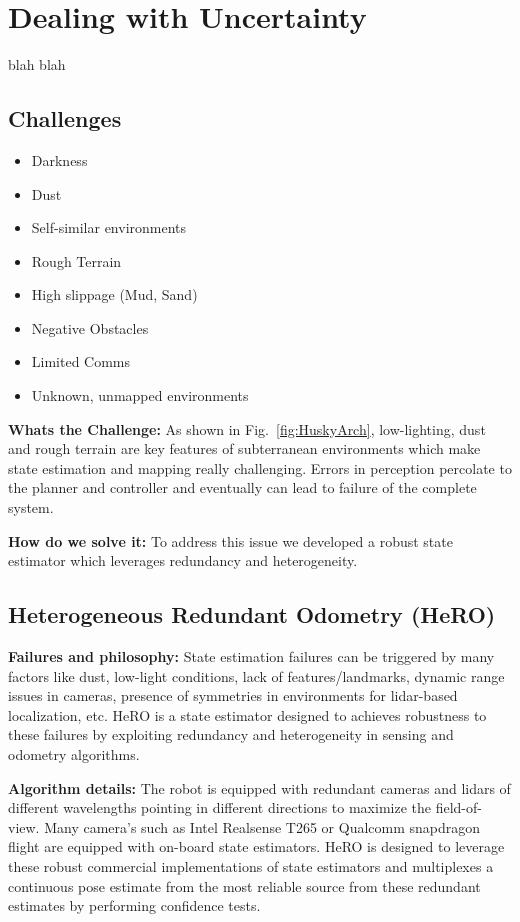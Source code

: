 \documentclass[letterpaper, 10 pt, conference]{ieeeconf}  %
\newcommand{\pr}[1]{\textbf{#1:}}  %
\begin{document}
\section{Dealing with Uncertainty}
blah blah

\subsection{Challenges}
\begin{itemize}
    \item Darkness
    \item Dust
    \item Self-similar environments
    \item Rough Terrain
    \item High slippage (Mud, Sand)
    \item Negative Obstacles
    \item Limited Comms
    \item Unknown, unmapped environments
\end{itemize}

\pr{Whats the Challenge}
As shown in Fig.~\ref{fig:HuskyArch}, low-lighting, dust and rough terrain are key features of subterranean environments which make state estimation and mapping really challenging.
Errors in perception percolate to the planner and controller and eventually can lead to failure of the complete system. 

\pr{How do we solve it}
To address this issue we developed a robust state estimator which leverages redundancy and heterogeneity.

\subsection{Heterogeneous Redundant Odometry (HeRO)}
\pr{Failures and philosophy}
State estimation failures can be triggered by many factors like dust, low-light conditions, lack of features/landmarks, dynamic range issues in cameras, presence of symmetries in environments for lidar-based localization, etc.
HeRO \cite{hero2019isrr} is a state estimator designed to achieves robustness to these failures by exploiting redundancy and heterogeneity in sensing and odometry algorithms. 

\pr{Algorithm details}
The robot is equipped with redundant cameras and lidars of different wavelengths pointing in different directions to maximize the field-of-view.
Many camera's such as Intel Realsense T265 or Qualcomm snapdragon flight are equipped with on-board state estimators. 
HeRO is designed to leverage these robust commercial implementations of state estimators and multiplexes a continuous pose estimate from the most reliable source from these redundant estimates by performing confidence tests.
\end{document}

